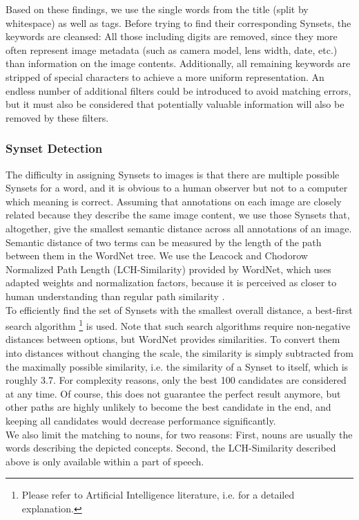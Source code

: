 Based on these findings, we use the single words from the title (split by whitespace) as well as tags. Before trying to find their corresponding Synsets, the keywords are cleansed: All those including digits are removed, since they more often represent image metadata (such as camera model, lens width, date, etc.) than information on the image contents. Additionally, all remaining keywords are stripped of special characters to achieve a more uniform representation. An endless number of additional filters could be introduced to avoid matching errors, but it must also be considered that potentially valuable information will also be removed by these filters.\\

\subsubsection{Synset Detection}
\label{sec_synsetdetection}
The difficulty in assigning Synsets to images is that there are multiple possible Synsets for a word, and it is obvious to a human observer but not to a computer which meaning is correct. Assuming that annotations on each image are closely related because they describe the same image content, we use those Synsets that, altogether, give the smallest semantic distance across all annotations of an image. Semantic distance of two terms can be measured by the length of the path between them in the WordNet tree. We use the Leacock and Chodorow Normalized Path Length (LCH-Similarity) provided by WordNet, which uses adapted weights and normalization factors, because it is perceived as closer to human understanding than regular path similarity \cite{budanitsky01}. \\

To efficiently find the set of Synsets with the smallest overall distance, a best-first search algorithm \footnote{Please refer to Artificial Intelligence literature, i.e. \cite{kumar2008} for a detailed explanation.} is used. Note that such search algorithms require non-negative distances between options, but WordNet provides similarities. To convert them into distances without changing the scale, the similarity is simply subtracted from the maximally possible similarity, i.e. the similarity of a Synset to itself, which is roughly 3.7.
For complexity reasons, only the best 100 candidates are considered at any time. Of course, this does not guarantee the perfect result anymore, but other paths are highly unlikely to become the best candidate in the end, and keeping all candidates would decrease performance significantly. \\
We also limit the matching to nouns, for two reasons: First, nouns are usually the words describing the depicted concepts. Second, the LCH-Similarity described above is only available within a part of speech\cite{pedersen2004wordnet}.

